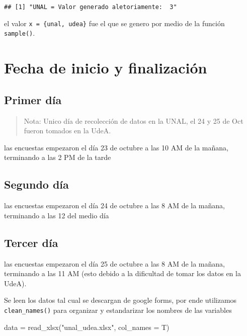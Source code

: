 \documentclass[
]{article}
\newenvironment{Shaded}{\begin{snugshade}}{\end{snugshade}}
\newcommand{\AttributeTok}[1]{\textcolor[rgb]{0.77,0.63,0.00}{#1}}
\newcommand{\FunctionTok}[1]{\textcolor[rgb]{0.00,0.00,0.00}{#1}}
\newcommand{\NormalTok}[1]{#1}
\newcommand{\OtherTok}[1]{\textcolor[rgb]{0.56,0.35,0.01}{#1}}
\newcommand{\StringTok}[1]{\textcolor[rgb]{0.31,0.60,0.02}{#1}}
\begin{document}
\begin{verbatim}
## [1] "UNAL = Valor generado aletoriamente:  3"
\end{verbatim}

el valor \texttt{x\ =\ \{unal,\ udea\}} fue el que se genero por medio
de la función \texttt{sample()}.

\hypertarget{fecha-de-inicio-y-finalizaciuxf3n}{%
\section{Fecha de inicio y
finalización}\label{fecha-de-inicio-y-finalizaciuxf3n}}

\hypertarget{primer-duxeda}{%
\subsection{Primer día}\label{primer-duxeda}}

\begin{quote}
Nota: Unico día de recolección de datos en la UNAL, el 24 y 25 de Oct
fueron tomados en la UdeA.
\end{quote}

las encuestas empezaron el día 23 de octubre a las 10 AM de la mañana,
terminando a las 2 PM de la tarde

\hypertarget{segundo-duxeda}{%
\subsection{Segundo día}\label{segundo-duxeda}}

las encuestas empezaron el día 24 de octubre a las 8 AM de la mañana,
terminando a las 12 del medio día

\hypertarget{tercer-duxeda}{%
\subsection{Tercer día}\label{tercer-duxeda}}

las encuestas empezaron el día 25 de octubre a las 8 AM de la mañana,
terminando a las 11 AM (esto debido a la dificultad de tomar los datos
en la UdeA).

Se leen los datos tal cual se descargan de google forms, por ende
utilizamos \texttt{clean\_names()} para organizar y estandarizar los
nombres de las variables

\begin{Shaded}
\begin{Highlighting}[]
\NormalTok{data }\OtherTok{=} \FunctionTok{read\_xlsx}\NormalTok{(}\StringTok{"unal\_udea.xlsx"}\NormalTok{, }\AttributeTok{col\_names =}\NormalTok{ T)}
\end{Highlighting}
\end{Shaded}
\end{document}
